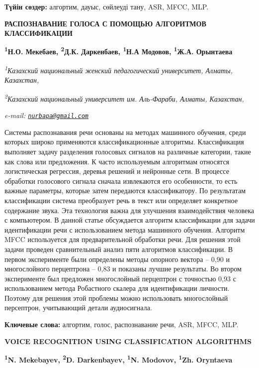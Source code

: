 {\bfseries Түйін сөздер:} алгортим, дауыс, сөйлеуді тану, ASR, MFCC, MLP.

\begin{articleheader}
{\bfseries РАСПОЗНАВАНИЕ ГОЛОСА С ПОМОЩЬЮ АЛГОРИТМОВ КЛАССИФИКАЦИИ}

{\bfseries
\textsuperscript{1}Н.О. Мекебаев\textsuperscript{\envelope },
\textsuperscript{2}Д.К. Даркенбаев,
\textsuperscript{1}Н.А Модовов,
\textsuperscript{1}Ж.А. Орынтаева}
\end{articleheader}

\begin{affiliation}
{\em \textsuperscript{1}Казахский национальный женский педагогический университет, Алматы, Казахстан,}

{\em \textsuperscript{2}Казахский национальный университет им. Аль-Фараби, Алматы, Казахстан,}

{\em e-mail: \href{mailto:nurbapa@gmail.com}{\nolinkurl{nurbapa@gmail.com}}}
\end{affiliation}

Системы распознавания речи основаны на методах машинного обучения, среди
которых широко применяются классификационные алгоритмы. Классификация
выполняет задачу разделения голосовых сигналов на различные категории,
такие как слова или предложения. К часто используемым алгоритмам
относятся логистическая регрессия, деревья решений и нейронные сети. В
процессе обработки голосового сигнала сначала извлекаются его
особенности, то есть важные параметры, которые затем передаются
классификатору. По результатам классификации система преобразует речь в
текст или определяет конкретное содержание звука. Эта технология важна
для улучшения взаимодействия человека с компьютером. В данной статье
обсуждается алгоритм классификации для задачи идентификации речи с
использованием метода машинного обучения. Алгоритм MFCC используется для
предварительной обработки речи. Для решения этой задачи проведен
сравнительный анализ пяти алгоритмов классификации. В первом
эксперименте были определены методы опорного вектора -- 0,90 и
многослойного перцептрона -- 0,83 и показаны лучшие результаты. Во
втором эксперименте был предложен многослойный перцептрон с точностью
0,93 с использованием метода Робастного скалера для идентификации
личности. Поэтому для решения этой проблемы можно использовать
многослойный персептрон, учитывающий детали аудиосигнала.

{\bfseries Ключевые слова:} алгортим, голос, распознавание речи, ASR, MFCC,
MLP.

\begin{articleheader}
{\bfseries VOICE RECOGNITION USING CLASSIFICATION ALGORITHMS}

{\bfseries
\textsuperscript{1}N. Mekebayev\textsuperscript{\envelope },
\textsuperscript{2}D. Darkenbayev,
\textsuperscript{1}N. Modovov,
\textsuperscript{1}Zh. Oryntaeva}
\end{articleheader}

